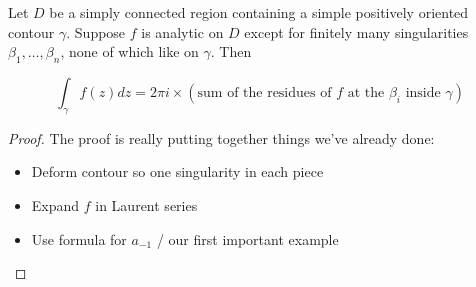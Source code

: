 \documentclass{beamer}
\begin{document}
\begin{frame}{}
\begin{theorem}
Let $D$ be a simply connected region containing a simple positively oriented contour $\gamma$.  Suppose $f$ is analytic on $D$ except for finitely many singularities $\beta_1,\dots, \beta_n$, none of which like on $\gamma$.  Then

$$\int_\gamma f(z)dz=2\pi i \times (\text{sum of the residues of $f$ at the $\beta_i$ inside $\gamma$})$$

\end{theorem}
\begin{proof}
The proof is really putting together things we've already done:
\begin{itemize}
    \item Deform contour so one singularity in each piece
    \item Expand $f$ in Laurent series
    \item Use formula for $a_{-1}$ / our first important example
\end{itemize}
\end{proof}
\end{frame}
\end{document}
